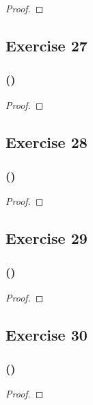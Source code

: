 \documentclass[14pt]{extarticle}
\begin{document}
\begin{proof}

\end{proof}

\subsection{Exercise 27}

\subsubsection{()}

\begin{proof}

\end{proof}

\subsection{Exercise 28}

\subsubsection{()}

\begin{proof}

\end{proof}

\subsection{Exercise 29}

\subsubsection{()}

\begin{proof}

\end{proof}

\subsection{Exercise 30}

\subsubsection{()}

\begin{proof}

\end{proof}
\end{document}
